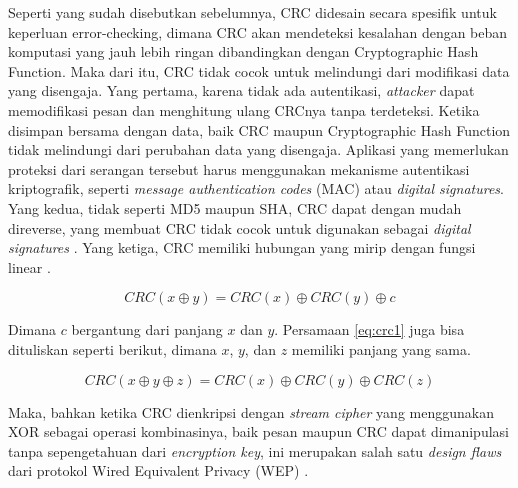 Seperti yang sudah disebutkan sebelumnya, CRC didesain secara spesifik untuk keperluan error-checking, dimana CRC akan mendeteksi kesalahan dengan beban komputasi yang jauh lebih ringan dibandingkan dengan Cryptographic Hash Function. Maka dari itu, CRC tidak cocok untuk melindungi dari modifikasi data yang disengaja. Yang pertama, karena tidak ada autentikasi, \emph{attacker} dapat memodifikasi pesan dan menghitung ulang CRCnya tanpa terdeteksi. Ketika disimpan bersama dengan data, baik CRC maupun Cryptographic Hash Function tidak melindungi dari perubahan data yang disengaja. Aplikasi yang memerlukan proteksi dari serangan tersebut harus menggunakan mekanisme autentikasi kriptografik, seperti \emph{message authentication codes} (MAC) atau \emph{digital signatures}. Yang kedua, tidak seperti MD5 maupun SHA, CRC dapat dengan mudah direverse, yang membuat CRC tidak cocok untuk digunakan sebagai \emph{digital signatures} \citep{martin2006}. Yang ketiga, CRC memiliki hubungan yang mirip dengan fungsi linear \citep{poncho2016}. 

\begin{equation}
  \label{eq:crc1}
  CRC(x\oplus y) = CRC(x) \oplus CRC(y) \oplus c
\end{equation}

Dimana \(c\) bergantung dari panjang \(x\) dan \(y\). Persamaan \ref{eq:crc1} juga bisa dituliskan seperti berikut, dimana \(x\), \(y\), dan \(z\) memiliki panjang yang sama.

\begin{equation}
  \label{eq:crc2}
  CRC(x\oplus y \oplus z) = CRC(x) \oplus CRC(y) \oplus CRC(z)
\end{equation}

Maka, bahkan ketika CRC dienkripsi dengan \emph{stream cipher} yang menggunakan XOR sebagai operasi kombinasinya, baik pesan maupun CRC dapat dimanipulasi tanpa sepengetahuan dari \emph{encryption key}, ini merupakan salah satu \emph{design flaws} dari protokol Wired Equivalent Privacy (WEP) \citep{winget2003}.

\lipsum[16-18]



\lipsum[19-20]
